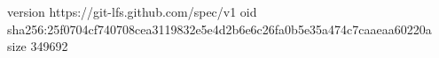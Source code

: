 version https://git-lfs.github.com/spec/v1
oid sha256:25f0704cf740708cea3119832e5e4d2b6e6c26fa0b5e35a474c7caaeaa60220a
size 349692
